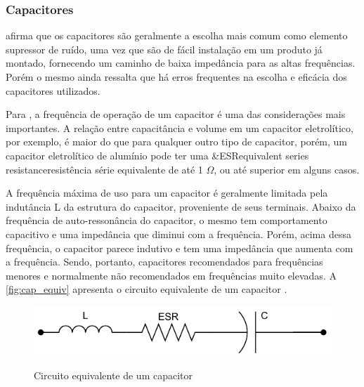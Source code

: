             \subsubsection{Capacitores} \label{cap:fund_emc_conv_mitig_cap}
            
             afirma que os capacitores são geralmente a escolha mais comum como elemento supressor de ruído, uma vez que são de fácil instalação em um produto já montado, fornecendo um caminho de baixa impedância para as altas frequências. Porém o mesmo ainda ressalta que há erros frequentes na escolha e eficácia dos capacitores utilizados. 
            
            Para , a frequência de operação de um capacitor é uma das considerações mais importantes. A relação entre capacitância e volume em um capacitor eletrolítico, por exemplo, é maior do que para qualquer outro tipo de capacitor, porém, um capacitor eletrolítico de alumínio pode ter uma \abreviatura&{ESR}{equivalent series resistance}{resistência série equivalente} de até 1 $\Omega$, ou até superior em alguns casos.
            
            A frequência máxima de uso para um capacitor é geralmente limitada pela indutância L da estrutura do capacitor, proveniente de seus terminais. Abaixo da frequência de auto-ressonância do capacitor, o mesmo tem comportamento capacitivo e uma impedância que diminui com a frequência. Porém, acima dessa frequência, o capacitor parece indutivo e tem uma impedância que aumenta com a frequência. Sendo, portanto, capacitores recomendados para frequências menores e normalmente não recomendados em frequências muito elevadas. A \autoref{fig:cap_equiv} apresenta o circuito equivalente de um capacitor \cite{ref:EMC_livro_NoiseReduct}. 
            
            \begin{figure}[H]
            	\centering
            	\caption{Circuito equivalente de um capacitor}
            	\includegraphics[scale=.8]{pdf/outros/cap_equiv3.pdf}
            	\label{fig:cap_equiv}
            \end{figure}
            
